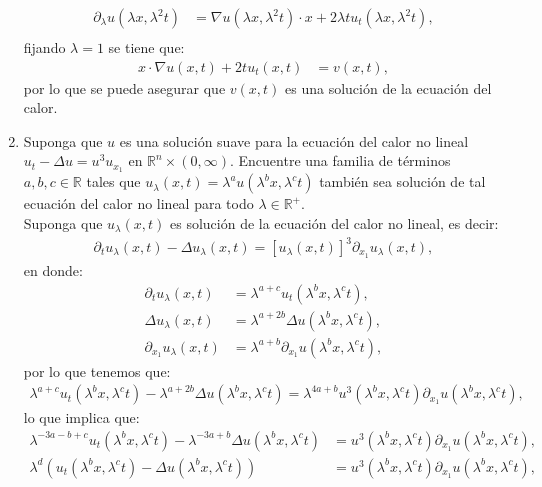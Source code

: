 \begin{homeworkProblem}
\begin{solucion}
\begin{enumerate}
        \begin{align*}
          \partial_{\lambda}u(\lambda x,\lambda^2 t)&=\nabla u (\lambda x,\lambda^2 t)\cdot x+2\lambda tu_{t}(\lambda x,\lambda^2 t),\\
        \end{align*}
        fijando $\lambda=1$ se tiene que:
        \begin{align*}
          x\cdot \nabla u(x,t)+2tu_t(x,t)&=v(x,t),
        \end{align*}
        por lo que se puede asegurar que $v(x,t)$ es una solución de la ecuación del calor.
        \demostrado
      \item Suponga que $u$ es una solución suave para la ecuación del calor no lineal $u_t-\Delta u=u^3u_{x_1}$ en $\mathbb{R}^{n}\times (0,\infty)$. Encuentre una familia de términos $a,b,c\in\mathbb{R}$ tales que $u_\lambda(x,t)=\lambda^au(\lambda^bx,\lambda^ct)$ también sea solución de tal ecuación del calor no lineal para todo $\lambda\in\mathbb{R}^{+}$.\\
        Suponga que $u_{\lambda}(x,t)$ es solución de la ecuación del calor no lineal, es decir:
        \begin{align*}
          \partial_{t}u_{\lambda}(x,t)-\Delta u_{\lambda}(x,t)=[u_{\lambda}(x,t)]^3\partial_{x_1}u_{\lambda}(x,t),
        \end{align*}
        en donde:
        \begin{align*}
          \partial_{t}u_{\lambda}(x,t)&=\lambda^{a+c}u_t(\lambda^{b}x,\lambda^{c}t),\\
          \Delta u_{\lambda}(x,t)&=\lambda^{a+2b}\Delta u(\lambda^{b}x,\lambda^{c}t),\\
          \partial_{x_1}u_{\lambda}(x,t)&=\lambda^{a+b}\partial_{x_1}u(\lambda^{b}x,\lambda^{c}t),
        \end{align*}
        por lo que tenemos que:
        \begin{align*}
          \lambda^{a+c}u_{t}(\lambda^{b}x,\lambda^{c}t)-\lambda^{a+2b}\Delta u(\lambda^{b}x,\lambda^{c}t)=\lambda^{4a+b}u^3(\lambda^{b}x,\lambda^{c}t)\partial_{x_1}u(\lambda^{b}x,\lambda^{c}t),
        \end{align*}
        lo que implica que:
        \begin{align*}
          \lambda^{-3a-b+c}u_{t}(\lambda^{b}x,\lambda^{c}t)-\lambda^{-3a+b}\Delta u(\lambda^{b}x,\lambda^{c}t)&=u^3(\lambda^{b}x,\lambda^{c}t)\partial_{x_1}u(\lambda^{b}x,\lambda^{c}t),\\
          \lambda^{d}(u_{t}(\lambda^{b}x,\lambda^{c}t)-\Delta u(\lambda^{b}x,\lambda^{c}t))&=u^3(\lambda^{b}x,\lambda^{c}t)\partial_{x_1}u(\lambda^{b}x,\lambda^{c}t),

\end{align*}
\end{enumerate}
\end{solucion}
\end{homeworkProblem}
